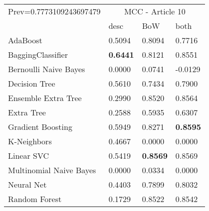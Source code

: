 \begin{tabular}{|l|l|l|l| }
\hline
Prev=0.7773109243697479 &  \multicolumn{3}{c|}{MCC - Article 10} \\
\cline{2-4} & desc & BoW & both \\ \hline
AdaBoost                & 0.5094 & 0.8094 & 0.7716\\
BaggingClassifier       & {\bf 0.6441} & 0.8121 & 0.8551\\
Bernoulli Naive Bayes   & 0.0000 & 0.0741 & -0.0129\\
Decision Tree           & 0.5610 & 0.7434 & 0.7900\\
Ensemble Extra Tree     & 0.2990 & 0.8520 & 0.8564\\
Extra Tree              & 0.2588 & 0.5935 & 0.6307\\
Gradient Boosting       & 0.5949 & 0.8271 & {\bf 0.8595}\\
K-Neighbors             & 0.4667 & 0.0000 & 0.0000\\
Linear SVC              & 0.5419 & {\bf 0.8569} & 0.8569\\
Multinomial Naive Bayes & 0.0000 & 0.0334 & 0.0000\\
Neural Net              & 0.4403 & 0.7899 & 0.8032\\
Random Forest           & 0.1729 & 0.8522 & 0.8542\\
\hline
\end{tabular}